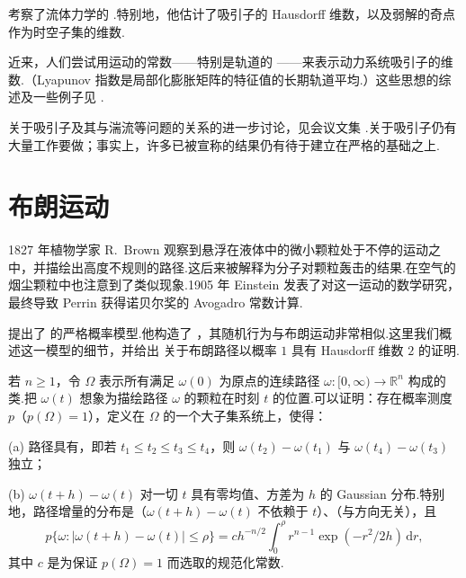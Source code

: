 \textcite{temam1983} 考察了流体力学的 .特别地，他估计了吸引子的 Hausdorff 维数，以及弱解的奇点作为时空子集的维数.

近来，人们尝试用运动的常数——特别是轨道的 ——来表示动力系统吸引子的维数.（Lyapunov 指数是局部化膨胀矩阵的特征值的长期轨道平均.）这些思想的综述及一些例子见 \textcite{frederickson1983}.

关于吸引子及其与湍流等问题的关系的进一步讨论，见会议文集 \textcites{temam1976,bernardratiu1977,haken1982,guckenheimerholmes1983,barenblattioossjoseph1983}.关于吸引子仍有大量工作要做；事实上，许多已被宣称的结果仍有待于建立在严格的基础之上.

\section{布朗运动}

1827 年植物学家 R.~Brown 观察到悬浮在液体中的微小颗粒处于不停的运动之中，并描绘出高度不规则的路径.这后来被解释为分子对颗粒轰击的结果.在空气的烟尘颗粒中也注意到了类似现象.1905 年 Einstein 发表了对这一运动的数学研究，最终导致 Perrin 获得诺贝尔奖的 Avogadro 常数计算.

\textcite{wiener1923} 提出了 的严格概率模型.他构造了 ，其随机行为与布朗运动非常相似.这里我们概述这一模型的细节，并给出 \textcite{taylor1953} 关于布朗路径以概率 $1$ 具有 Hausdorff 维数 $2$ 的证明.

若 $n\geq 1$，令 $\Omega$ 表示所有满足 $\omega(0)$ 为原点的连续路径 $\omega:[0,\infty)\to\mathbb{R}^n$ 构成的类.把 $\omega(t)$ 想象为描绘路径 $\omega$ 的颗粒在时刻 $t$ 的位置.可以证明：存在概率测度 $p$（$p(\Omega)=1$），定义在 $\Omega$ 的一个大子集系统上，使得：

(a) 路径具有，即若 $t_1\leq t_2\leq t_3\leq t_4$，则 $\omega(t_2)-\omega(t_1)$ 与 $\omega(t_4)-\omega(t_3)$ 独立；

(b) $\omega(t+h)-\omega(t)$ 对一切 $t$ 具有零均值、方差为 $h$ 的 Gaussian 分布.特别地，路径增量的分布是（$\omega(t+h)-\omega(t)$ 不依赖于 $t$）、（与方向无关），且
\begin{equation}\label{eq:8.54}
  p\{\omega:|\omega(t+h)-\omega(t)|\leq\rho\}
  =ch^{-n/2}\int_{0}^{\rho}r^{n-1}\exp(-r^{2}/2h)\,\mathrm{d}r,
\end{equation}
其中 $c$ 是为保证 $p(\Omega)=1$ 而选取的规范化常数.

